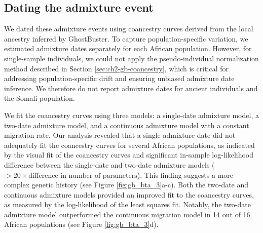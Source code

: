 \clearpage

\subsection{Dating the admixture event}
\label{sec:ch3-gb-bta-dating}

We dated these admixture events using coancestry curves derived from the local ancestry inferred by GhostBuster. To capture population-specific variation, we estimated admixture dates separately for each African population. However, for single-sample individuals, we could not apply the pseudo-individual normalization method described in Section \ref{sec:ch2-gb-coancestry}, which is critical for addressing population-specific drift and ensuring unbiased admixture date inference. We therefore do not report admixture dates for ancient individuals and the Somali population.

We fit the coancestry curves using three models: a single-date admixture model, a two-date admixture model, and a continuous admixture model with a constant migration rate. Our analysis revealed that a single admixture date did not adequately fit the coancestry curves for several African populations, as indicated by the visual fit of the coancestry curves and significant in-sample log-likelihood difference between the single-date and two-date admixture models ($> 20 \times \text{difference in number of parameters}$). This finding suggests a more complex genetic history (see Figure \ref{fig:gb_bta_3}a-c). Both the two-date and continuous admixture models provided an improved fit to the coancestry curves, as measured by the log-likelihood of the least squares fit. Notably, the two-date admixture model outperformed the continuous migration model in 14 out of 16 African populations (see Figure \ref{fig:gb_bta_3}d).

